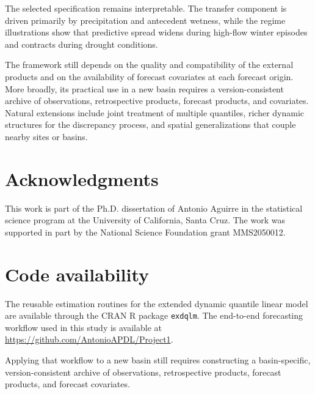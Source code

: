 \documentclass[APA,STIX1COL]{WileyNJD-v2}
\begin{document}
The selected specification remains interpretable. The transfer component is driven primarily by precipitation and antecedent wetness, while the regime illustrations show that predictive spread widens during high-flow winter episodes and contracts during drought conditions.

The framework still depends on the quality and compatibility of the external products and on the availability of forecast covariates at each forecast origin. More broadly, its practical use in a new basin requires a version-consistent archive of observations, retrospective products, forecast products, and covariates. Natural extensions include joint treatment of multiple quantiles, richer dynamic structures for the discrepancy process, and spatial generalizations that couple nearby sites or basins.




\section*{Acknowledgments}

This work is part of the Ph.D. dissertation of Antonio Aguirre in the statistical science program at the University of California, Santa Cruz. The work was supported in part by the National Science
Foundation grant MMS2050012.

\section*{Code availability}

The reusable estimation routines for the extended dynamic quantile linear model are available through the CRAN R package \texttt{exdqlm}. The end-to-end forecasting workflow used in this study is available at \url{https://github.com/AntonioAPDL/Project1}.

Applying that workflow to a new basin still requires constructing a basin-specific, version-consistent archive of observations, retrospective products, forecast products, and forecast covariates.


\end{document}
